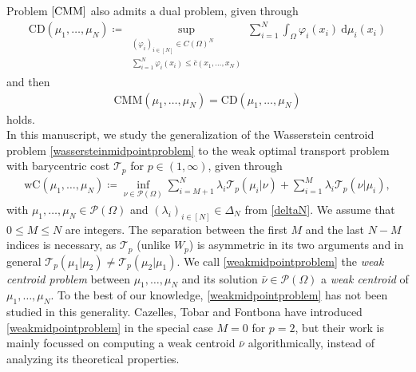 \documentclass[10pt,a4paper]{amsart}
\newcommand{\dd}{\mathrm{d}}
\begin{document}
Problem $\eqref{CMM}$ also admits a dual problem, given through
\begin{gather}\label{CD}
	\text{CD}(\mu_1,\dots,\mu_N)\coloneqq \sup_{\substack{(\varphi_i)_{i\in[N]}\in C(\Omega)^N\\
	\sum_{i=1}^N\varphi_i(x_i)\leq \bar c(x_1,\dots,x_N)	
}}\sum_{i=1}^N\int_\Omega\varphi_i(x_i)\ \dd\mu_i(x_i)
\end{gather}
and then
\begin{gather*}
	\text{CMM}(\mu_1,\dots,\mu_N)=\text{CD}(\mu_1,\dots,\mu_N)
\end{gather*}
holds.\\
In this manuscript, we study the generalization of the Wasserstein centroid problem \eqref{wassersteinmidpointproblem} to the weak optimal transport problem with barycentric cost $\mathcal T_p$ for $p\in(1,\infty)$, given through
\begin{gather}\label{weakmidpointproblem}
	\text{wC}(\mu_1,\dots,\mu_N)\coloneqq\inf_{\nu\in\mathcal P(\Omega)}\sum_{i=M+1}^N\mathcal \lambda_i \mathcal T_p(\mu_i|\nu)+\sum_{i=1}^M\lambda_i\mathcal T_p(\nu|\mu_i),
\end{gather}
with $\mu_1,\dots,\mu_N\in\mathcal P(\Omega)$ and $(\lambda_i)_{i\in[N]}\in\Delta_N$ from \eqref{deltaN}. We assume that $0\leq M\leq N$ are integers. The separation between the first $M$ and the last $N-M$ indices is necessary, as $\mathcal T_p$ (unlike $W_p$) is asymmetric in its two arguments and in general $\mathcal T_p(\mu_1|\mu_2)\neq\mathcal T_p(\mu_2|\mu_1)$. We call \eqref{weakmidpointproblem} the \textit{weak centroid problem} between $\mu_1,\dots,\mu_N$ and its solution $\bar\nu\in\mathcal P(\Omega)$ a \textit{weak centroid} of $\mu_1,\dots,\mu_N$. To the best of our knowledge, \eqref{weakmidpointproblem} has not been studied in this generality. Cazelles, Tobar and Fontbona \cite{cazelles2021} have introduced \eqref{weakmidpointproblem} in the special case $M=0$ for $p=2$, but their work is mainly focussed on computing a weak centroid $\bar\nu$ algorithmically, instead of analyzing its theoretical properties.
\end{document}
